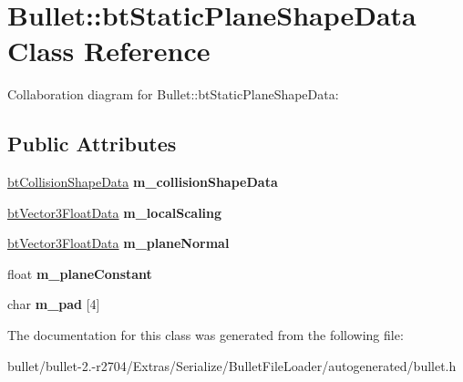 \hypertarget{class_bullet_1_1bt_static_plane_shape_data}{\section{Bullet\+:\+:bt\+Static\+Plane\+Shape\+Data Class Reference}
\label{class_bullet_1_1bt_static_plane_shape_data}
}


Collaboration diagram for Bullet\+:\+:bt\+Static\+Plane\+Shape\+Data\+:
\subsection*{Public Attributes}
\begin{DoxyCompactItemize}
\item 
\hypertarget{class_bullet_1_1bt_static_plane_shape_data_a3d0fbca8ce5daeee7be504da20571755}{\hyperlink{class_bullet_1_1bt_collision_shape_data}{bt\+Collision\+Shape\+Data} {\bfseries m\+\_\+collision\+Shape\+Data}}\label{class_bullet_1_1bt_static_plane_shape_data_a3d0fbca8ce5daeee7be504da20571755}

\item 
\hypertarget{class_bullet_1_1bt_static_plane_shape_data_a6c9c80df574fe3239c583443c38c8b7d}{\hyperlink{class_bullet_1_1bt_vector3_float_data}{bt\+Vector3\+Float\+Data} {\bfseries m\+\_\+local\+Scaling}}\label{class_bullet_1_1bt_static_plane_shape_data_a6c9c80df574fe3239c583443c38c8b7d}

\item 
\hypertarget{class_bullet_1_1bt_static_plane_shape_data_a3d471512c3066067611c411be3a25bd6}{\hyperlink{class_bullet_1_1bt_vector3_float_data}{bt\+Vector3\+Float\+Data} {\bfseries m\+\_\+plane\+Normal}}\label{class_bullet_1_1bt_static_plane_shape_data_a3d471512c3066067611c411be3a25bd6}

\item 
\hypertarget{class_bullet_1_1bt_static_plane_shape_data_ab3fecc88fe188a612850f57776acdf12}{float {\bfseries m\+\_\+plane\+Constant}}\label{class_bullet_1_1bt_static_plane_shape_data_ab3fecc88fe188a612850f57776acdf12}

\item 
\hypertarget{class_bullet_1_1bt_static_plane_shape_data_a354c52815d3005df5d8f1737c17498c2}{char {\bfseries m\+\_\+pad} \mbox{[}4\mbox{]}}\label{class_bullet_1_1bt_static_plane_shape_data_a354c52815d3005df5d8f1737c17498c2}

\end{DoxyCompactItemize}


The documentation for this class was generated from the following file\+:\begin{DoxyCompactItemize}
\item 
bullet/bullet-\/2.-\/r2704/\+Extras/\+Serialize/\+Bullet\+File\+Loader/autogenerated/bullet.\+h\end{DoxyCompactItemize}
